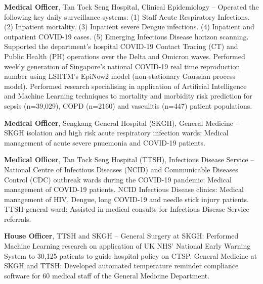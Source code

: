 \documentclass[letterpaper,10pt,oneside]{article}
\begin{document}
\begin{body}
\BigGap
{\textbf{Medical Officer}, Tan Tock Seng Hospital, Clinical Epidemiology}
\hfill
{} --
\BulletItem
Operated the following key daily surveillance systems: (1) Staff Acute Respiratory Infections. (2) Inpatient mortality. (3) Inpatient severe Dengue infections. (4) Inpatient and outpatient COVID-19 cases. (5) Emerging Infectious Disease horizon scanning.
\BulletItem
Supported the department's hospital COVID-19 Contact Tracing (CT) and Public Health (PH) operations over the Delta and Omicron waves.
\BulletItem
Performed weekly generation of Singapore's national COVID-19 real time reproduction number using LSHTM's EpiNow2 model (non-stationary Gaussian process model).
\BulletItem
Performed research specialising in application of Artificial Intelligence and Machine Learning techniques to mortality and morbidity risk prediction for sepsis (n=39,029), COPD (n=2160) and vasculitis (n=447) patient populations.

\BigGap
{\textbf{Medical Officer}, Sengkang General Hospital (SKGH), General Medicine}
\hfill
{} --
\BulletItem
SKGH isolation and high risk acute respiratory infection wards: Medical management of acute severe pnuemonia and COVID-19 patients.

\BigGap
{\textbf{Medical Officer}, Tan Tock Seng Hospital (TTSH), Infectious Disease Service}
\hfill
{} --
\BulletItem
National Centre of Infectious Diseases (NCID) and Communicable Diseases Control (CDC) outbreak wards during the COVID-19 pandemic: Medical management of COVID-19 patients.
\BulletItem
NCID Infectious Disease clinics: Medical management of HIV, Dengue, long COVID-19 and needle stick injury patients.
\BulletItem
TTSH general ward: Assisted in medical consults for Infectious Disease Service referrals. 

\BigGap
{\textbf{House Officer}, TTSH and SKGH}
\hfill
{} --
\BulletItem
General Surgery at SKGH: Performed Machine Learning research on application of UK NHS' National Early Warning System to 30,125 patients to guide hospital policy on CTSP.
\BulletItem
General Medicine at SKGH and TTSH: Developed automated temperature reminder compliance software for 60 medical staff of the General Medicine Department.




\end{body}
\end{document}
